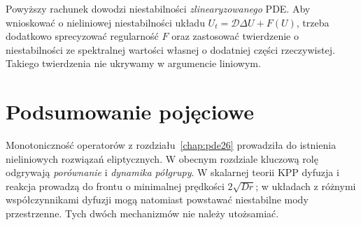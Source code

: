 \begin{uwaga}
Powyższy rachunek dowodzi niestabilności
\emph{zlinearyzowanego} PDE. Aby wnioskować o
nieliniowej niestabilności układu
$U_t=\mathcal D\Delta U+F(U)$, trzeba dodatkowo
sprecyzować regularność $F$ oraz zastosować
twierdzenie o niestabilności ze spektralnej wartości
własnej o dodatniej części rzeczywistej.
Takiego twierdzenia nie ukrywamy w argumencie liniowym.
\end{uwaga}

\section{Podsumowanie pojęciowe}
Monotoniczność operatorów z rozdziału~\ref{chap:pde26}
prowadziła do istnienia nieliniowych rozwiązań eliptycznych.
W obecnym rozdziale kluczową rolę odgrywają
\emph{porównanie} i \emph{dynamika półgrupy}.
W skalarnej teorii KPP dyfuzja i reakcja prowadzą
do frontu o minimalnej prędkości $2\sqrt{Dr}$;
w układach z różnymi współczynnikami dyfuzji
mogą natomiast powstawać niestabilne mody przestrzenne.
Tych dwóch mechanizmów nie należy utożsamiać.

